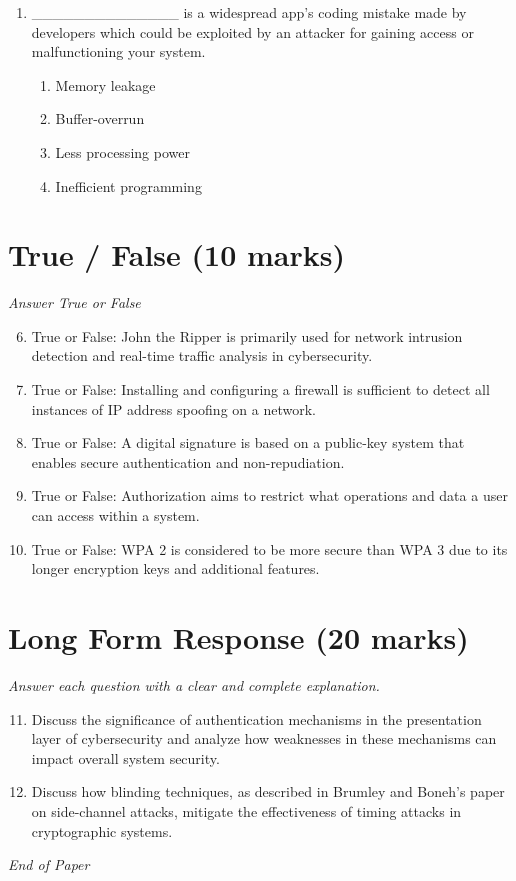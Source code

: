 \documentclass[12pt]{article}
\begin{document}
\begin{enumerate}[label=\arabic*.]
\begin{enumerate}[label=(\alph*)]
    \item Access Port
\end{enumerate}
\item \_\_\_\_\_\_\_\_\_\_\_\_\_\_ is a widespread app's coding mistake made by developers which could be exploited by an attacker for gaining access or malfunctioning your system.
\begin{enumerate}[label=(\alph*)]
    \item Memory leakage
    \item Buffer-overrun
    \item Less processing power
    \item Inefficient programming
\end{enumerate}
\end{enumerate}

\section*{True / False (10 marks)}
\textit{Answer True or False}
\begin{enumerate}[label=\arabic*.]
\setcounter{enumi}{5}
\item True or False: John the Ripper is primarily used for network intrusion detection and real-time traffic analysis in cybersecurity.
\item True or False: Installing and configuring a firewall is sufficient to detect all instances of IP address spoofing on a network.
\item True or False: A digital signature is based on a public-key system that enables secure authentication and non-repudiation.
\item True or False: Authorization aims to restrict what operations and data a user can access within a system.
\item True or False: WPA 2 is considered to be more secure than WPA 3 due to its longer encryption keys and additional features.
\end{enumerate}

\section*{Long Form Response (20 marks)}
\textit{Answer each question with a clear and complete explanation.}
\begin{enumerate}[label=\arabic*.]
\setcounter{enumi}{10}
\item Discuss the significance of authentication mechanisms in the presentation layer of cybersecurity and analyze how weaknesses in these mechanisms can impact overall system security.
\item Discuss how blinding techniques, as described in Brumley and Boneh's paper on side-channel attacks, mitigate the effectiveness of timing attacks in cryptographic systems.
\end{enumerate}

\vfill
\noindent\textit{End of Paper}
\end{document}
